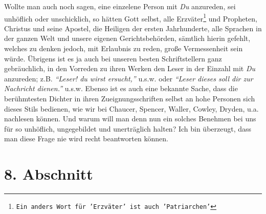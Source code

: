 Wollte man auch noch sagen, eine einzelene Person mit \textit{Du} anzureden, sei
unhöflich oder unschicklich, so hätten Gott selbst, alle Erzväter\footnote{\texttt{Ein anders Wort für 'Erzväter' ist auch 'Patriarchen'}} 
und Propheten,
Christus und seine Apostel, die Heiligen der ersten Jahrhunderte, alle Sprachen
in der ganzen Welt und unsere eigenen Gerichtsbehörden, sämtlich hierin
gefehlt, welches zu denken jedoch, mit Erlaubnis zu reden, große Vermessenheit
sein würde. Übrigens ist es ja auch bei unseren besten Schriftstellern ganz
gebräuchlich, in den Vorreden zu ihren Werken den Leser in der Einzahl mit
\textit{Du} anzureden; z.B. \textit{"`Leser! du wirst ersucht,"'} u.s.w. oder
\textit{"`Leser dieses
soll dir zur Nachricht dienen."'} u.s.w. Ebenso ist es auch eine bekannte
Sache,
dass die berühmtesten Dichter in ihren Zueignungsschriften selbst an hohe
Personen sich dieses Stils bedienen, wie wir bei
Chaucer, Spencer,
Waller,
Cowley, Dryden, u.a. nachlesen
können. Und warum will man denn nun ein solches
Benehmen bei uns für so unhöflich, ungegebildet und unerträglich halten? Ich bin
überzeugt, dass man diese Frage nie wird recht beantworten können.

\section{8. Abschnitt} \label{kap10_ab8}

